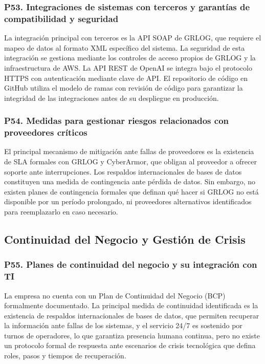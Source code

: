 \documentclass[12pt]{article}
\begin{document}
\subsubsection*{\textbf{P53. Integraciones de sistemas con terceros y garant\'ias de compatibilidad y seguridad}}

La integraci\'on principal con terceros es la API SOAP de GRLOG, que requiere el
mapeo de datos al formato XML espec\'ifico del sistema. La seguridad de esta integraci\'on
se gestiona mediante los controles de acceso propios de GRLOG y la infraestructura de AWS.
La API REST de OpenAI se integra bajo el protocolo HTTPS con autenticaci\'on
mediante clave de API. El repositorio de c\'odigo en GitHub utiliza el modelo de
ramas con revisi\'on de c\'odigo para garantizar la integridad de las integraciones antes
de su despliegue en producci\'on.

\subsubsection*{\textbf{P54. Medidas para gestionar riesgos relacionados con proveedores cr\'iticos}}

El principal mecanismo de mitigaci\'on ante fallas de proveedores es la existencia de
SLA formales con GRLOG y CyberArmor, que obligan al proveedor a ofrecer soporte
ante interrupciones. Los respaldos internacionales de bases de datos constituyen
una medida de contingencia ante p\'erdida de datos. Sin embargo, no existen planes de
contingencia formales que definan qu\'e hacer si GRLOG no est\'a disponible por un per\'iodo
prolongado, ni proveedores alternativos identificados para reemplazarlo en caso necesario.

\subsection{Continuidad del Negocio y Gesti\'on de Crisis}

\subsubsection*{\textbf{P55. Planes de continuidad del negocio y su integraci\'on con TI}}

La empresa no cuenta con un Plan de Continuidad del Negocio (BCP) formalmente
documentado. La principal medida de continuidad identificada es la existencia de respaldos
internacionales de bases de datos, que permiten recuperar la informaci\'on ante fallas de
los sistemas, y el servicio 24/7 es sostenido por turnos de operadores, lo que garantiza
presencia humana continua, pero no existe un protocolo formal de respuesta ante escenarios
de crisis tecnol\'ogica que defina roles, pasos y tiempos de recuperaci\'on.
\end{document}
